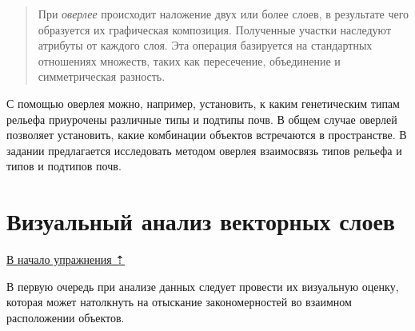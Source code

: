 \documentclass[
  12pt,
]{book}
\begin{document}
\begin{quote}
При \emph{оверлее} происходит наложение двух или более слоев, в результате чего образуется их графическая композиция. Полученные участки наследуют атрибуты от каждого слоя. Эта операция базируется на стандартных отношениях множеств, таких как пересечение, объединение и симметрическая разность.
\end{quote}

С помощью оверлея можно, например, установить, к каким генетическим типам рельефа приурочены различные типы и подтипы почв. В общем случае оверлей позволяет установить, какие комбинации объектов встречаются в пространстве. В задании предлагается исследовать методом оверлея взаимосвязь типов рельефа и типов и подтипов почв.

\hypertarget{overlay-vectors}{%
\section{Визуальный анализ векторных слоев}\label{overlay-vectors}}

\protect\hyperlink{overlay}{В начало упражнения ⇡}

В первую очередь при анализе данных следует провести их визуальную оценку, которая может натолкнуть на отыскание закономерностей во взаимном расположении объектов.
\end{document}
